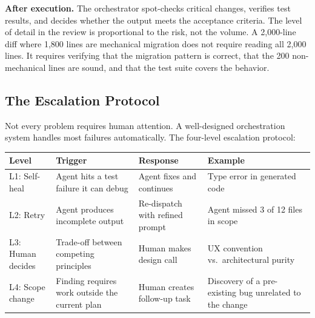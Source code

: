 \documentclass[
  a4paper,
  DIV=11,
  numbers=noendperiod]{scrreprt}
\newcounter{none} %
\begin{document}
\textbf{After execution.} The orchestrator spot-checks critical changes,
verifies test results, and decides whether the output meets the
acceptance criteria. The level of detail in the review is proportional
to the risk, not the volume. A 2,000-line diff where 1,800 lines are
mechanical migration does not require reading all 2,000 lines. It
requires verifying that the migration pattern is correct, that the 200
non-mechanical lines are sound, and that the test suite covers the
behavior.

\subsection{The Escalation Protocol}\label{the-escalation-protocol}

Not every problem requires human attention. A well-designed
orchestration system handles most failures automatically. The four-level
escalation protocol:

{\def\LTcaptype{none} %
\begin{longtable}[]{@{}
  >{\raggedright\arraybackslash}p{}
  >{\raggedright\arraybackslash}p{}
  >{\raggedright\arraybackslash}p{}
  >{\raggedright\arraybackslash}p{}@{}}
\toprule\noalign{}
\begin{minipage}[b]{\linewidth}\raggedright
Level
\end{minipage} & \begin{minipage}[b]{\linewidth}\raggedright
Trigger
\end{minipage} & \begin{minipage}[b]{\linewidth}\raggedright
Response
\end{minipage} & \begin{minipage}[b]{\linewidth}\raggedright
Example
\end{minipage} \\
\midrule\noalign{}
\endhead
\bottomrule\noalign{}
\endlastfoot
L1: Self-heal & Agent hits a test failure it can debug & Agent fixes and
continues & Type error in generated code \\
L2: Retry & Agent produces incomplete output & Re-dispatch with refined
prompt & Agent missed 3 of 12 files in scope \\
L3: Human decides & Trade-off between competing principles & Human makes
design call & UX convention vs.~architectural purity \\
L4: Scope change & Finding requires work outside the current plan &
Human creates follow-up task & Discovery of a pre-existing bug unrelated
to the change \\
\end{longtable}
}
\end{document}
